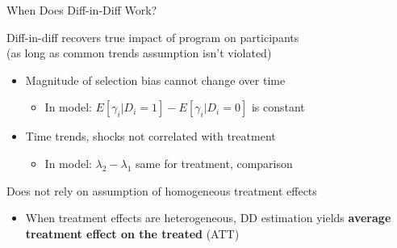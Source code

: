 \documentclass[10pt,xcolor=table,ignorenonframetext,handout,aspectratio=169]{beamer}
\newlength{\wideitemsep}
\let\olditem\item
\renewcommand{\item}{\setlength{\itemsep}{\wideitemsep}\olditem}
\begin{document}
\begin{frame}{When Does Diff-in-Diff Work?}

\medskip
Diff-in-diff recovers true impact of program on participants \\
(as long as common trends assumption isn't violated)

\pause
\medskip
\begin{itemize}
	
\item Magnitude of selection bias cannot change over time
	
\medskip
\begin{itemize}
	
	\item In model:  $E [ \gamma_i \vert D_i = 1 ] - E [ \gamma_i \vert D_i = 0 ] $ is constant
	
\end{itemize}

\pause
\item Time trends, shocks not correlated with treatment

\medskip
\begin{itemize}
	
	\item In model:  $\lambda_2 - \lambda_1 $ same for treatment, comparison
	
\end{itemize}
	
\end{itemize}

\pause
\medskip
\medskip
Does not rely on assumption of homogeneous treatment effects

\medskip
\begin{itemize}
	
	\item When treatment effects are heterogeneous, DD estimation yields \textbf{average treatment effect on the treated} (ATT)
	
\end{itemize}

\end{frame}


\end{document}
